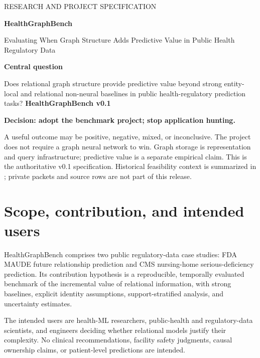 \documentclass[11pt,a4paper]{article}
\begin{document}
\hypersetup{pageanchor=false}
\begin{titlepage}
{\sffamily\color{Accent}\large RESEARCH AND PROJECT SPECIFICATION\par}
\vspace{25mm}
{\sffamily\bfseries\color{Ink}\Huge HealthGraphBench\par}
\vspace{8mm}
{\sffamily\LARGE Evaluating When Graph Structure Adds Predictive Value in Public Health Regulatory Data\par}
\vspace{15mm}
\textbf{Central question}\par
Does relational graph structure provide predictive value beyond strong entity-local and relational non-neural baselines in public health-regulatory prediction tasks?
\vspace{10mm}
{\sffamily\bfseries HealthGraphBench v0.1}\par
\textbf{Decision: adopt the benchmark project; stop application hunting.}\par
A useful outcome may be positive, negative, mixed, or inconclusive. The project does not require a graph neural network to win. Graph storage is representation and query infrastructure; predictive value is a separate empirical claim.
\vfill
This is the authoritative v0.1 specification. Historical feasibility context is summarized in ; private packets and source rows are not part of this release.
\end{titlepage}
\hypersetup{pageanchor=true}
\tableofcontents
\clearpage
{}

\section{Scope, contribution, and intended users}
HealthGraphBench comprises two public regulatory-data case studies: FDA MAUDE future relationship prediction and CMS nursing-home serious-deficiency prediction. Its contribution hypothesis is a reproducible, temporally evaluated benchmark of the incremental value of relational information, with strong baselines, explicit identity assumptions, support-stratified analysis, and uncertainty estimates.

The intended users are health-ML researchers, public-health and regulatory-data scientists, and engineers deciding whether relational models justify their complexity. No clinical recommendations, facility safety judgments, causal ownership claims, or patient-level predictions are intended.
\end{document}
